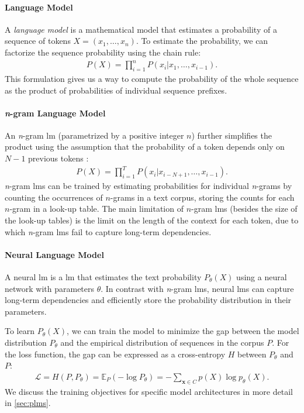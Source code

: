 {\paragraph{Language Model} A \emph{language model} is a mathematical model that estimates a probability of a sequence of tokens $X = (x_1, \ldots, x_n)$. To estimate the probability, we can factorize the sequence probability using the chain rule:
\begin{align}
    P(X) = \prod_{i=1}^n P(x_i|x_1, \hdots, x_{i-1}).
\end{align}
This formulation gives us a way to compute the probability of the whole sequence as the product of probabilities of individual sequence prefixes.

\paragraph{\emph{n}-gram Language Model} An \emph{n}-gram \ac{lm} (parametrized by a positive integer $n$) further simplifies the product using the assumption that the probability of a token depends only on $N-1$ previous tokens \cite[p.32]{jurafsky2024}:
\begin{align}
    P(X) = \prod_{i=1}^T P(x_i|x_{i-N+1}, \hdots,x_{i-1}).
\end{align}
\emph{n}-gram \acp{lm} can be trained by estimating probabilities for individual \emph{n}-grams by counting the occurrences of $n$-grams in a text corpus, storing the counts for each $n$-gram in a look-up table. The main limitation of $n$-gram \acp{lm} (besides the size of the look-up tables) is the limit on the length of the context for each token, due to which \emph{n}-gram \acp{lm} fail to capture long-term dependencies.




\paragraph{Neural Language Model} A neural \ac{lm} is a \acl{lm} that estimates the text probability $P_\theta(X)$ using a neural network with parameters $\theta$. In contrast with \emph{n}-gram \acp{lm}, neural \acp{lm} can capture long-term dependencies and efficiently store the probability distribution in their parameters.

To learn $P_\theta(X)$, we can train the model to minimize the gap between the model distribution $P_\theta$ and the empirical distribution of sequences in the corpus $P$. For the loss function, the gap can be expressed as a cross-entropy $H$ between $P_\theta$ and $P$:
\begin{align}
    \mathcal{L} = H(P,P_\theta) = \mathbb{E}_P(-\log P_\theta) = -\sum_{\mathbf{x}\in C}p(X)\log p_{\theta}(X).
\end{align}
We discuss the training objectives for specific model architectures in more detail in \autoref{sec:plms}.


}
